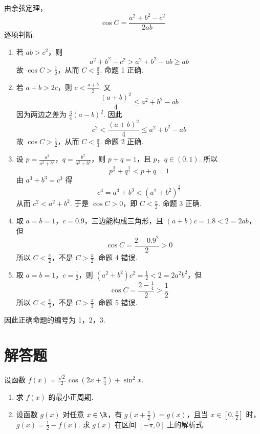 \begin{solution}
由余弦定理，
\[
\cos C=\frac{a^2+b^2-c^2}{2ab}
\]
逐项判断.

\begin{enumerate}
\item 若 \(ab>c^2\)，则
\[
a^2+b^2-c^2>a^2+b^2-ab\geqslant ab
\]
故 \(\cos C>\frac12\)，从而 \(C<\frac\pi3\). 命题 1 正确.

\item 若 \(a+b>2c\)，则 \(c<\frac{a+b}{2}\). 又
\[
\frac{(a+b)^2}{4}\leqslant a^2+b^2-ab
\]
因为两边之差为 \(\frac34(a-b)^2\). 因此
\[
c^2<\frac{(a+b)^2}{4}\leqslant a^2+b^2-ab
\]
故 \(\cos C>\frac12\)，从而 \(C<\frac\pi3\). 命题 2 正确.

\item 设 \(p=\frac{a^2}{a^2+b^2}\)，\(q=\frac{b^2}{a^2+b^2}\)，则 \(p+q=1\)，且 \(p\)，\(q\in(0,1)\). 所以
\[
p^{\frac{3}{2}}+q^{\frac{3}{2}}<p+q=1
\]
由 \(a^3+b^3=c^3\) 得
\[
c^3=a^3+b^3<(a^2+b^2)^{\frac{3}{2}}
\]
从而 \(c^2<a^2+b^2\). 于是 \(\cos C>0\)，即 \(C<\frac\pi2\). 命题 3 正确.

\item 取 \(a=b=1\)，\(c=0.9\)，三边能构成三角形，且 \((a+b)c=1.8<2=2ab\)，但
\[
\cos C=\frac{2-0.9^2}{2}>0
\]
所以 \(C<\frac\pi2\)，不是 \(C>\frac\pi2\). 命题 4 错误.

\item 取 \(a=b=1\)，\(c=\frac12\)，则 \((a^2+b^2)c^2=\frac12<2=2a^2b^2\)，但
\[
\cos C=\frac{2-\frac14}{2}>\frac12
\]
所以 \(C<\frac\pi3\)，不是 \(C>\frac\pi3\). 命题 5 错误.
\end{enumerate}

因此正确命题的编号为 1，2，3.
\end{solution}

\section{解答题}

\begin{problem}
设函数 \(f(x) = \frac{\sqrt{2}}{2}\cos \left(2x + \frac{\pi}{4}\right) + \sin^2 x\).

\begin{enumerate}
\item 求 \( f(x) \) 的最小正周期.
\item 设函数 \( g(x) \) 对任意 \( x \in \R \)，有 \( g\left(x + \frac{\pi}{2}\right) = g(x) \)，且当 \( x \in \left[0, \frac{\pi}{2}\right] \) 时，\( g(x) = \frac{1}{2} - f(x) \). 求 \( g(x) \) 在区间 \([- \pi, 0]\) 上的解析式.
\end{enumerate}
\end{problem}

